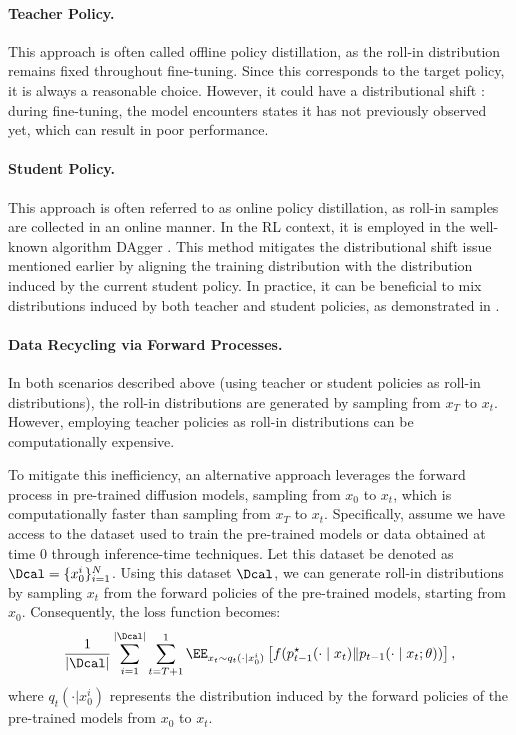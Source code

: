 \paragraph{Teacher Policy.} This approach is often called offline policy distillation, as the roll-in distribution remains fixed throughout fine-tuning. 
Since this corresponds to the target policy, it is always a reasonable choice. However, it could have a distributional shift \citep{ross2010efficient}: during fine-tuning, the model encounters states it has not previously observed yet, which can result in poor performance.

\paragraph{Student Policy.} This approach is often referred to as online policy distillation, as roll-in samples are collected in an online manner. In the RL context, it is employed in the well-known algorithm DAgger \citep{ross2011reduction}. This method mitigates the distributional shift issue mentioned earlier by aligning the training distribution with the distribution induced by the current student policy. In practice, it can be beneficial to mix distributions induced by both teacher and student policies, as demonstrated in \citet{ross2011reduction,sun2017deeply,chang2023learning}.

\paragraph{Data Recycling via Forward Processes.}

In both scenarios described above (using teacher or student policies as roll-in distributions), the roll-in distributions are generated by sampling from $x_T$ to $x_t$. However, employing teacher policies as roll-in distributions can be computationally expensive.

To mitigate this inefficiency, an alternative approach leverages the forward process in pre-trained diffusion models, sampling from $x_0$ to $x_t$, which is computationally faster than sampling from 
 $x_T$ to $x_t$. Specifically, assume we have access to the dataset used to train the pre-trained models or data obtained at time $0$ through inference-time techniques.  Let this dataset be denoted as $\Dcal =\{x^i_0\}_{i=1}^N$.  Using this dataset $\Dcal$, we can generate roll-in distributions by sampling $x_t$ from the forward policies of the pre-trained models, starting from $x_0$. Consequently, the loss function becomes:
\begin{align}
\label{eq:loss_forward_roll_in_distribution}
    \frac{1}{|\Dcal| }\sum_{i=1}^{|\Dcal|} \sum_{t=T+1}^1  \EE_{x_t \sim q_t(\cdot \mid x^i_0) }\left [f(p^{\star}_{t-1}(\cdot \mid x_t) \|p_{t-1}(\cdot \mid x_t;\theta) )\right ], 
\end{align}
where $q_t(\cdot|x^i_0)$ represents the distribution induced by the forward policies of the pre-trained models from $x_0$ to $x_t$.




